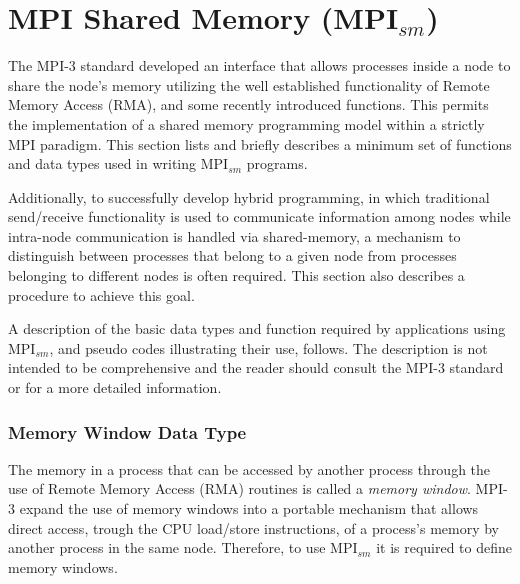 \section{MPI Shared Memory (MPI$_{sm}$)} \label{MPISharedMemory}

The MPI-3 standard developed an interface that allows processes inside a node to share the node's memory utilizing the well established functionality of Remote Memory Access (RMA), and some recently introduced functions. This permits the implementation of a shared memory programming model within a strictly MPI paradigm. This section lists and briefly describes a minimum set of functions and data types used in writing MPI$_{sm}$ programs. 

\medskip

Additionally, to successfully develop hybrid programming, in which traditional send/receive functionality is used to communicate information among nodes while intra-node communication is handled via shared-memory, a mechanism to distinguish between processes that belong to a given node from processes belonging to different nodes is often required. This section also describes a procedure to achieve this goal. 


\medskip

A description of the basic data types and function required by applications using MPI$_{sm}$, and pseudo codes illustrating their use, follows. The description is not intended to be comprehensive and the reader should consult the MPI-3 standard\cite{MPI-3}  or \cite{UsingAdvancedMPI} for a more detailed information.


\medskip

\subsubsection*{Memory Window Data Type}

The memory in a process that can be accessed by another process through the use of Remote Memory Access (RMA) routines is called a \emph{memory window}. MPI-3 expand the use of memory windows into a portable mechanism that allows direct access, trough the CPU load/store instructions, of a process's memory by another process in the same node. Therefore, to use MPI$_{sm}$ it is required to define memory windows.

\medskip

